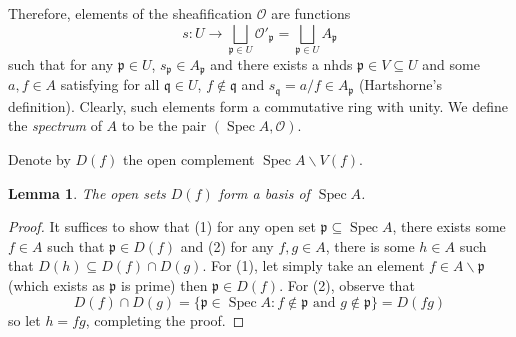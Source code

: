 \documentclass[12pt]{article}
\newtheorem{lemma}{Lemma}[subsection]
\theoremstyle{remark}
\newcommand{\Spec}[0]{\operatorname{Spec}}
\begin{document}
	Therefore, elements of the sheafification $\mathscr O$ are functions 
	\[s:U\to \bigsqcup_{\mathfrak p\in U} \mathscr O'_{\mathfrak p}=\bigsqcup_{\mathfrak p\in U} A_{\mathfrak p}\]
	such that for any $\mathfrak p\in U$, $s_{\mathfrak p}\in A_{\mathfrak p}$ and there exists a nhds $\mathfrak p\in V\subseteq U$ and some $a, f\in A$ satisfying for all $\mathfrak q\in U$, $f\notin \mathfrak q$ and $s_{\mathfrak q}= a/f\in A_{\mathfrak p}$ (Hartshorne's definition). Clearly, such elements form a commutative ring with unity. We define the \textit{spectrum} of $A$ to be the pair $(\Spec A, \mathscr O)$. 
	
	Denote by $D(f)$ the open complement $\Spec A\backslash V(f)$.
	\begin{lemma}\label{l212}
	The open sets $D(f)$ form a basis of $\Spec A$.
	\end{lemma}
	\begin{proof}
	It suffices to show that (1) for any open set $\mathfrak p\subseteq \Spec A$, there exists some $f\in A$ such that $\mathfrak p \in D(f)$ and (2) for any $f, g\in A$, there is some $h\in A$ such that $D(h)\subseteq D(f)\cap D(g)$. For (1), let simply take an element $f\in A\backslash\mathfrak p$ (which exists as $\mathfrak p$ is prime) then $\mathfrak p\in D(f)$. For (2), observe that 
	\[D(f)\cap D(g)=\{\mathfrak p\in\Spec A: f\notin \mathfrak p\text{ and }g\notin \mathfrak p\}=D(fg)\]
	so let $h=fg$, completing the proof.
	\end{proof}
	
\end{document}
